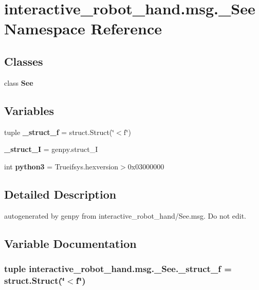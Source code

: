 \section{interactive\-\_\-robot\-\_\-hand.\-msg.\-\_\-\-See Namespace Reference}
\label{namespaceinteractive__robot__hand_1_1msg_1_1__See}
\subsection*{Classes}
\begin{DoxyCompactItemize}
\item 
class {\bf See}
\end{DoxyCompactItemize}
\subsection*{Variables}
\begin{DoxyCompactItemize}
\item 
tuple {\bf \-\_\-struct\-\_\-f} = struct.\-Struct(\char`\"{}$<$f\char`\"{})
\item 
{\bf \-\_\-struct\-\_\-\-I} = genpy.\-struct\-\_\-\-I
\item 
int {\bf python3} = Trueifsys.\-hexversion$>$0x03000000
\end{DoxyCompactItemize}


\subsection{Detailed Description}
\begin{DoxyVerb}autogenerated by genpy from interactive_robot_hand/See.msg. Do not edit.\end{DoxyVerb}
 

\subsection{Variable Documentation}
\subsubsection[{\-\_\-struct\-\_\-f}]{\setlength{\rightskip}{0pt plus 5cm}tuple interactive\-\_\-robot\-\_\-hand.\-msg.\-\_\-\-See.\-\_\-struct\-\_\-f = struct.\-Struct(\char`\"{}$<$f\char`\"{})}\label{namespaceinteractive__robot__hand_1_1msg_1_1__See_a12cff5b90670fd9498660d8e232a87eb}


